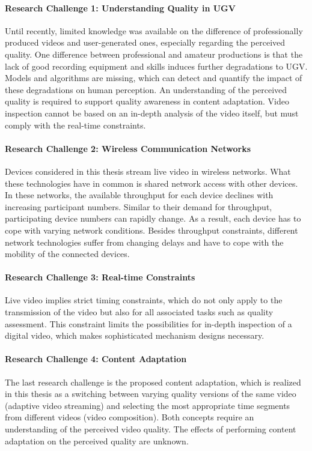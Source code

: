 \paragraph{Research Challenge 1: Understanding Quality in \ac{UGV}}
Until recently, limited knowledge was available on the difference of professionally produced videos and user-generated ones, especially regarding the perceived quality.
One difference between professional and amateur productions is that the lack of good recording equipment and skills induces further degradations to \ac{UGV}.
Models and algorithms are missing, which can detect and quantify the impact of these degradations on human perception.
An understanding of the perceived quality is required to support quality awareness in content adaptation.
Video inspection cannot be based on an in-depth analysis of the video itself, but must comply with the real-time constraints.
\paragraph{Research Challenge 2: Wireless Communication Networks}
Devices considered in this thesis stream live video in wireless networks. 
What these technologies have in common is shared network access with other devices.
In these networks, the available throughput for each device declines with increasing participant numbers.
Similar to their demand for throughput, participating device numbers can rapidly change. As a result, each device has to cope with varying network conditions.
Besides throughput constraints, different network technologies suffer from changing delays and have to cope with the mobility of the connected devices.
\paragraph{Research Challenge 3: Real-time Constraints}
Live video implies strict timing constraints, which do not only apply to the transmission of the video but also for all associated tasks such as quality assessment.
This constraint limits the possibilities for in-depth inspection of a digital video, which makes sophisticated mechanism designs necessary.
\paragraph{Research Challenge 4: Content Adaptation}
The last research challenge is the proposed content adaptation, which is realized in this thesis as a switching between varying quality versions of the same video (adaptive video streaming) and selecting the most appropriate time segments from different videos (video composition).
Both concepts require an understanding of the perceived video quality.
The effects of performing content adaptation on the perceived quality are unknown.
